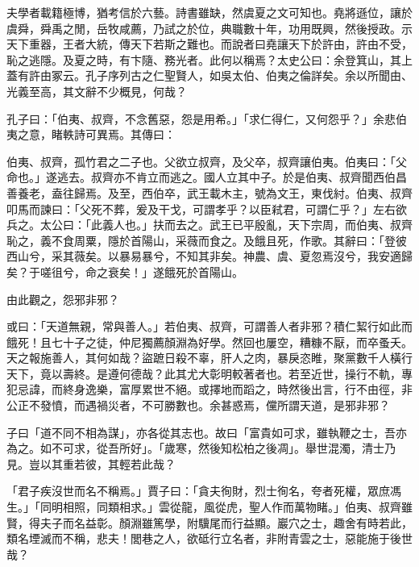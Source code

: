 
\begin{pinyinscope}
夫學者載籍極博，猶考信於六藝。詩書雖缺，然虞夏之文可知也。堯將遜位，讓於虞舜，舜禹之閒，岳牧咸薦，乃試之於位，典職數十年，功用既興，然後授政。示天下重器，王者大統，傳天下若斯之難也。而說者曰堯讓天下於許由，許由不受，恥之逃隱。及夏之時，有卞隨、務光者。此何以稱焉？太史公曰：余登箕山，其上蓋有許由冢云。孔子序列古之仁聖賢人，如吳太伯、伯夷之倫詳矣。余以所聞由、光義至高，其文辭不少概見，何哉？

孔子曰：「伯夷、叔齊，不念舊惡，怨是用希。」「求仁得仁，又何怨乎？」余悲伯夷之意，睹軼詩可異焉。其傳曰：

伯夷、叔齊，孤竹君之二子也。父欲立叔齊，及父卒，叔齊讓伯夷。伯夷曰：「父命也。」遂逃去。叔齊亦不肯立而逃之。國人立其中子。於是伯夷、叔齊聞西伯昌善養老，盍往歸焉。及至，西伯卒，武王載木主，號為文王，東伐紂。伯夷、叔齊叩馬而諫曰：「父死不葬，爰及干戈，可謂孝乎？以臣弒君，可謂仁乎？」左右欲兵之。太公曰：「此義人也。」扶而去之。武王已平殷亂，天下宗周，而伯夷、叔齊恥之，義不食周粟，隱於首陽山，采薇而食之。及餓且死，作歌。其辭曰：「登彼西山兮，采其薇矣。以暴易暴兮，不知其非矣。神農、虞、夏忽焉沒兮，我安適歸矣？于嗟徂兮，命之衰矣！」遂餓死於首陽山。

由此觀之，怨邪非邪？

或曰：「天道無親，常與善人。」若伯夷、叔齊，可謂善人者非邪？積仁絜行如此而餓死！且七十子之徒，仲尼獨薦顏淵為好學。然回也屢空，糟糠不厭，而卒蚤夭。天之報施善人，其何如哉？盜蹠日殺不辜，肝人之肉，暴戾恣睢，聚黨數千人橫行天下，竟以壽終。是遵何德哉？此其尤大彰明較著者也。若至近世，操行不軌，專犯忌諱，而終身逸樂，富厚累世不絕。或擇地而蹈之，時然後出言，行不由徑，非公正不發憤，而遇禍災者，不可勝數也。余甚惑焉，儻所謂天道，是邪非邪？

子曰「道不同不相為謀」，亦各從其志也。故曰「富貴如可求，雖執鞭之士，吾亦為之。如不可求，從吾所好」。「歲寒，然後知松柏之後凋」。舉世混濁，清士乃見。豈以其重若彼，其輕若此哉？

「君子疾沒世而名不稱焉。」賈子曰：「貪夫徇財，烈士徇名，夸者死權，眾庶馮生。」「同明相照，同類相求。」雲從龍，風從虎，聖人作而萬物睹。」伯夷、叔齊雖賢，得夫子而名益彰。顏淵雖篤學，附驥尾而行益顯。巖穴之士，趣舍有時若此，類名堙滅而不稱，悲夫！閭巷之人，欲砥行立名者，非附青雲之士，惡能施于後世哉？


\end{pinyinscope}